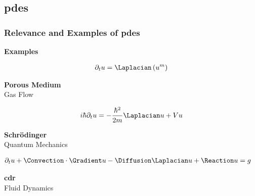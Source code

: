 \subsection{\texorpdfstring{\acrlong{pdes}}{}}

\begin{frame}
    \frametitle{Relevance and Examples of \acrfull{pdes}}


    \vspace*{\fill}
    \begin{center}
        {\color{\accentcolor} \Large \textbf{Examples}}
    \end{center}

    \begin{multicols}{3}

        \begin{center}
            \begin{align*}
                \partial_t u = \Laplacian \left( u^m \right)
            \end{align*}
            
            \vspace*{0.25cm}
            {\large \textbf{Porous Medium}} \\
            Gas Flow
        \end{center}

        \begin{center}
            \begin{align*}
                i \hbar \partial_t u = - \frac{\hbar^2}{2 m} \Laplacian u + V u
            \end{align*}
            
            \vspace*{0.25cm}
            {\large \textbf{Schrödinger}} \\
            Quantum Mechanics
        \end{center}

        \begin{center}
            \begin{align*}
                \partial_t u + \Convection \cdot \Gradient u - \Diffusion \Laplacian u + \Reaction u &= g
            \end{align*}

            \vspace*{0.25cm}
            {\large \textbf{\acrshort{cdr}}} \\
            Fluid Dynamics
        \end{center}

    \end{multicols}
    \vspace*{\fill}
    
\end{frame}

